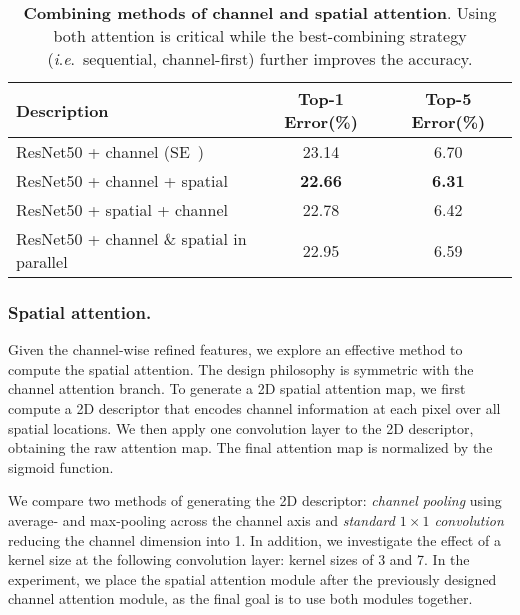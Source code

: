 \documentclass[runningheads]{llncs}
\newcommand{\ie}{\textit{i}.\textit{e}.}
\begin{document}
\begin{table}[t]
\begin{center}
\begin{adjustbox}{max width=\textwidth}
\begin{tabular}{l|c|c }
\hline
Description & Top-1 Error(\%) & Top-5 Error(\%) \\
\hline
\hline
ResNet50 + channel (SE~\cite{hu2017squeeze})
            & 23.14 &   6.70\\
\hline
ResNet50 + channel + spatial                  & \textbf{22.66}    & \textbf{6.31} \\
ResNet50 + spatial + channel                  & 22.78    & 6.42\\
ResNet50 + channel \& spatial in parallel     & 22.95        & 6.59\\
\hline
\end{tabular}
\end{adjustbox}
\end{center}
\caption{\textbf{Combining methods of channel and spatial attention}. Using both attention is critical while the best-combining strategy (\ie\ sequential, channel-first) further improves the accuracy.}
\vspace{-6mm}
\label{table:Ablation_sequence}
\end{table}

\subsubsection{Spatial attention.}
Given the channel-wise refined features, we explore an effective method to compute the spatial attention. The design philosophy is symmetric with the channel attention branch. To generate a 2D spatial attention map, we first compute a 2D descriptor that encodes channel information at each pixel over all spatial locations. We then apply one convolution layer to the 2D descriptor, obtaining the raw attention map. The final attention map is normalized by the sigmoid function. 

We compare two methods of generating the 2D descriptor: \textit{channel pooling} using average- and max-pooling across the channel axis and \textit{standard \(1\times 1\) convolution} reducing the channel dimension into 1. In addition, we investigate the effect of a kernel size at the following convolution layer: kernel sizes of 3 and 7. In the experiment, we place the spatial attention module after the previously designed channel attention module, as the final goal is to use both modules together.
\end{document}
